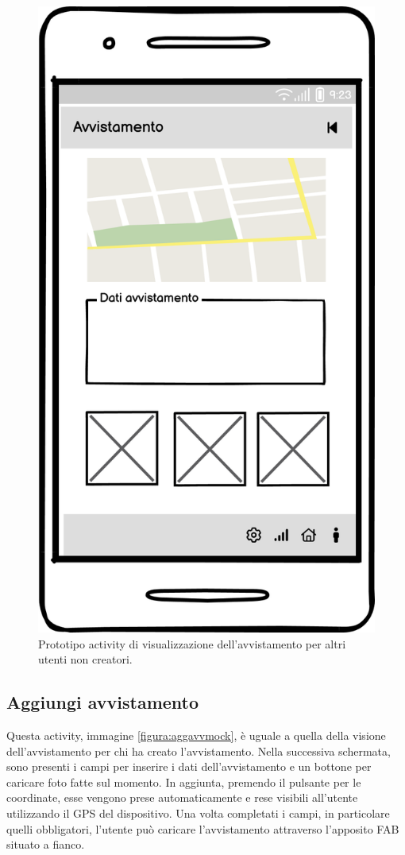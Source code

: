 \documentclass[a4paper,final,12pt]{report}
\begin{document}
\begin{figure}[hbtp]
\centering
\includegraphics[scale=0.50]{img_concettuale/Avv_mob.png}
\caption{Prototipo activity di visualizzazione dell'avvistamento per altri utenti non creatori.}
\label{figura:avvmobmock}
\end{figure}

\subsection{Aggiungi avvistamento}
Questa activity, immagine \ref{figura:aggavvmock}, è uguale a quella della visione dell'avvistamento per chi ha creato l'avvistamento. Nella successiva schermata, sono presenti i campi per inserire i dati dell'avvistamento e un bottone per caricare foto fatte sul momento. In aggiunta, premendo il pulsante per le coordinate, esse vengono prese automaticamente e rese visibili all'utente utilizzando il GPS del dispositivo. Una volta completati i campi, in particolare quelli obbligatori, l'utente può caricare l'avvistamento attraverso l'apposito FAB situato a fianco.
\end{document}
